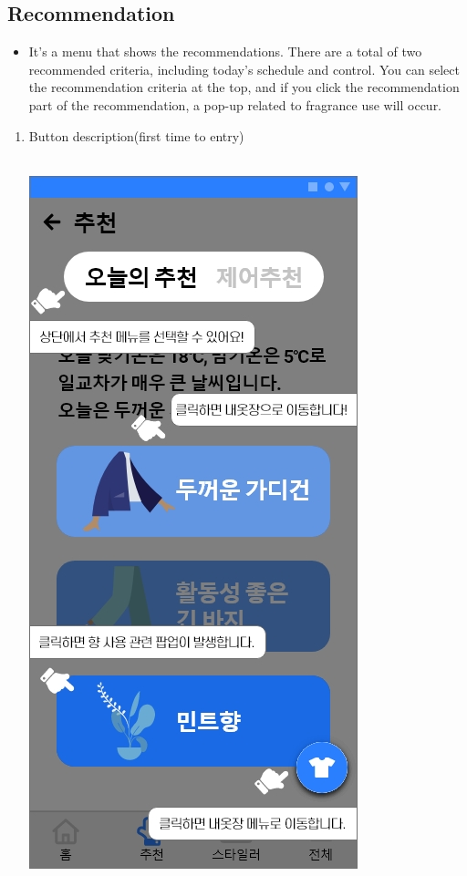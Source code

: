 \documentclass[conference]{IEEEtran}
\begin{document}
\subsection{Recommendation}
\begin{itemize}
\item[] It's a menu that shows the recommendations. There are a total of two recommended criteria, including today's schedule and control. You can select the recommendation criteria at the top, and if you click the recommendation part of the recommendation, a pop-up related to fragrance use will occur.\\
\end{itemize}
    \begin{enumerate}
    \item Button description(first time to entry) \\ \\
    \centerline{\includegraphics[scale=0.32]{assets/추천1.jpg}}

\end{enumerate}
\end{document}
